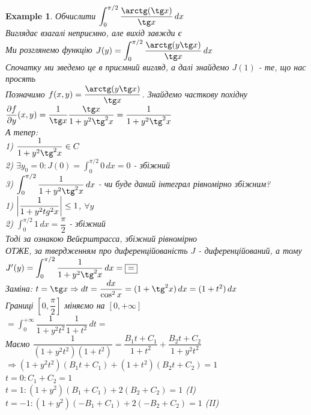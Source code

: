\documentclass[a4paper, 14pt]{extarticle}
\def\huge{\displaystyle}
\theoremstyle{theoremdd}
\theoremstyle{theoremdd}
\theoremstyle{theoremdd}
\theoremstyle{theoremdd}
\newtheorem{example}[theorem]{Example}
\theoremstyle{theoremdd}
\theoremstyle{theoremdd}
\theoremstyle{theoremdd}
\theoremstyle{theoremdd}
\def\departial#1#2{\dfrac{\partial {#1}}{\partial {#2}}}
\begin{document}
\begin{example}
Обчислити $\huge\int_0^{\pi/2} \dfrac{\arctg(\tg x)}{\tg x}\,dx$\\
Виглядає взагалі неприємно, але вихід завжди є\\
Ми розглянемо функцію $J(y) = \huge\int_0^{\pi/2} \dfrac{\arctg(y \tg x)}{\tg x}\,dx$ \\ Спочатку ми зведемо це в приємний вигляд, а далі знайдемо $J(1)$ - те, що нас просять\\
Позначимо $f(x,y) = \dfrac{\arctg(y \tg x)}{\tg x}$. Знайдемо часткову похідну\\
$\departial{f}{y}(x,y) = \dfrac{1}{\tg x} \dfrac{\tg x}{1+y^2 \tg^2 x} = \dfrac{1}{1 + y^2 \tg^2 x}$\\
А тепер:\\
1) $\dfrac{1}{1 + y^2 \tg^2 x} \in C$\\
2) $\exists y_0 = 0: J(0) = \huge\int_0^{\pi/2} 0\,dx = 0$ - збіжний\\
3) $\huge\int_{0}^{\pi/2} \dfrac{1}{1 + y^2 \tg^2x}\,dx$ - чи буде даний інтеграл рівномірно збіжним?\\
\text{ } \hspace{0.5cm} 1) $\abs{\dfrac{1}{1+y^2 tg^2 x}} \leq 1$, $\forall y$\\
\text{ } \hspace{0.5cm} 2) $\huge\int_0^{\pi/2} 1\,dx = \dfrac{\pi}{2}$ - збіжний\\
Тоді за ознакою Вейєрштрасса, збіжний рівномірно\\
ОТЖЕ, за твердженням про диференційованість $J$ - диференційований, а тому\\
$J'(y) = \huge\int_0^{\pi/2} \dfrac{1}{1+y^2 \tg^2 x}\,dx = \boxed{=}$\\
Заміна: $t = \tg x \Rightarrow dt = \dfrac{dx}{\cos^2 x} = (1+\tg^2x)\,dx = (1+t^2)\,dx$\\
Границі $\left[0, \dfrac{\pi}{2} \right]$ міняємо на $[0,+\infty]$\\
$\boxed{=} \huge \int_0^{+\infty} \dfrac{1}{1+y^2t^2} \dfrac{1}{1+t^2}\,dt \boxed{\boxed{=}}$\\
Маємо $\dfrac{1}{(1+y^2t^2)(1+t^2)} = \dfrac{B_1t+C_1}{1+t^2} + \dfrac{B_2t+C_2}{1+y^2t^2}$\\
$\Rightarrow (1+y^2t^2)(B_1t+C_1) + (1+t^2)(B_2t+C_2) = 1$\\
$t = 0: C_1 + C_2 = 1$\\
$t = 1: (1+y^2)(B_1+C_1) + 2(B_2+C_2) = 1$ (I)\\
$t = -1: (1+y^2)(-B_1+C_1) + 2(-B_2+C_2) = 1$ (II)\\

\end{example}
\end{document}
